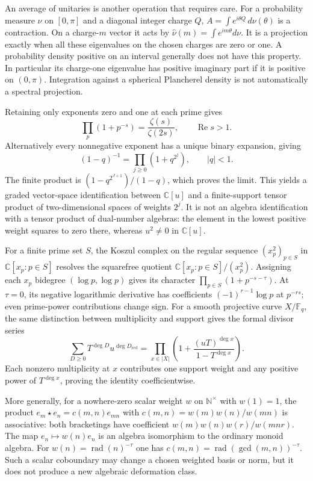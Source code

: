 An average of unitaries is another operation that requires care.
For a probability measure $\nu$ on $[0,\pi]$ and a diagonal integer charge $Q$,
$A=\int e^{i\theta Q}\,d\nu(\theta)$ is a contraction.
On a charge-$m$ vector it acts by $\widehat\nu(m)=\int e^{im\theta}d\nu$.
It is a projection exactly when all these eigenvalues on the chosen charges
are zero or one.  A probability density positive on an interval generally
does not have this property.  In particular its charge-one eigenvalue has
positive imaginary part if it is positive on $(0,\pi)$.
Integration against a spherical Plancherel density is not automatically a
spectral projection.

\begin{example}
Retaining only exponents zero and one at each prime gives
\[
 \prod_p(1+p^{-s})=\frac{\zeta(s)}{\zeta(2s)},\qquad \operatorname{Re}s>1.
\]
Alternatively every nonnegative exponent has a unique binary expansion, giving
\[
 (1-q)^{-1}=\prod_{j\geq0}(1+q^{2^j}),\qquad |q|<1.
\]
The finite product is $(1-q^{2^{J+1}})/(1-q)$, which proves the limit.
This yields a graded vector-space identification between $\mathbb C[u]$
and a finite-support tensor product of two-dimensional spaces of weights $2^j$.
It is not an algebra identification with a tensor product of dual-number
algebras: the element in the lowest positive weight squares to zero there,
whereas $u^2\ne0$ in $\mathbb C[u]$.
\end{example}

For a finite prime set $S$, the Koszul complex on the regular sequence
$(x_p^2)_{p\in S}$ in $\mathbb C[x_p:p\in S]$ resolves the squarefree
quotient $\mathbb C[x_p:p\in S]/(x_p^2)$.
Assigning each $x_p$ bidegree $(\log p,\log p)$ gives its character
$\prod_{p\in S}(1+p^{-s-\tau})$.
At $\tau=0$, its negative logarithmic derivative has coefficients
$(-1)^{r-1}\log p$ at $p^{-rs}$; even prime-power contributions change sign.
For a smooth projective curve $X/\mathbb F_q$, the same distinction between
multiplicity and support gives the formal divisor series
\[
 \sum_{D\geq0}T^{\deg D}u^{\deg D_{\mathrm{red}}}
 =\prod_{x\in|X|}\left(1+\frac{(uT)^{\deg x}}{1-T^{\deg x}}\right).
\]
Each nonzero multiplicity at $x$ contributes one support weight and any
positive power of $T^{\deg x}$, proving the identity coefficientwise.

More generally, for a nowhere-zero scalar weight $w$ on $\mathbb N^\times$
with $w(1)=1$, the product
$e_m\star e_n=c(m,n)e_{mn}$ with $c(m,n)=w(m)w(n)/w(mn)$ is associative:
both bracketings have coefficient $w(m)w(n)w(r)/w(mnr)$.
The map $e_n\mapsto w(n)e_n$ is an algebra isomorphism to the ordinary
monoid algebra.  For $w(n)=\operatorname{rad}(n)^{-\tau}$ one has
$c(m,n)=\operatorname{rad}(\gcd(m,n))^{-\tau}$.
Such a scalar coboundary may change a chosen weighted basis or norm, but it
does not produce a new algebraic deformation class.

